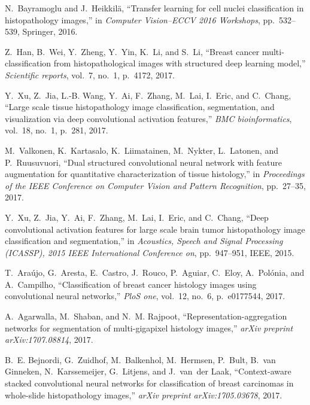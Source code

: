 \documentclass[runningheads,a4paper]{llncs}
\begin{document}
\begin{thebibliography}{10}
N.~Bayramoglu and J.~Heikkil{\"a}, ``Transfer learning for cell nuclei
  classification in histopathology images,'' in {\em Computer Vision--ECCV 2016
  Workshops}, pp.~532--539, Springer, 2016.

Z.~Han, B.~Wei, Y.~Zheng, Y.~Yin, K.~Li, and S.~Li, ``Breast cancer
  multi-classification from histopathological images with structured deep
  learning model,'' {\em Scientific reports}, vol.~7, no.~1, p.~4172, 2017.

Y.~Xu, Z.~Jia, L.-B. Wang, Y.~Ai, F.~Zhang, M.~Lai, I.~Eric, and C.~Chang,
  ``Large scale tissue histopathology image classification, segmentation, and
  visualization via deep convolutional activation features,'' {\em BMC
  bioinformatics}, vol.~18, no.~1, p.~281, 2017.

M.~Valkonen, K.~Kartasalo, K.~Liimatainen, M.~Nykter, L.~Latonen, and
  P.~Ruusuvuori, ``Dual structured convolutional neural network with feature
  augmentation for quantitative characterization of tissue histology,'' in {\em
  Proceedings of the IEEE Conference on Computer Vision and Pattern
  Recognition}, pp.~27--35, 2017.

Y.~Xu, Z.~Jia, Y.~Ai, F.~Zhang, M.~Lai, I.~Eric, and C.~Chang, ``Deep
  convolutional activation features for large scale brain tumor histopathology
  image classification and segmentation,'' in {\em Acoustics, Speech and Signal
  Processing (ICASSP), 2015 IEEE International Conference on}, pp.~947--951,
  IEEE, 2015.

T.~Ara{\'u}jo, G.~Aresta, E.~Castro, J.~Rouco, P.~Aguiar, C.~Eloy,
  A.~Pol{\'o}nia, and A.~Campilho, ``Classification of breast cancer histology
  images using convolutional neural networks,'' {\em PloS one}, vol.~12, no.~6,
  p.~e0177544, 2017.

A.~Agarwalla, M.~Shaban, and N.~M. Rajpoot, ``Representation-aggregation
  networks for segmentation of multi-gigapixel histology images,'' {\em arXiv
  preprint arXiv:1707.08814}, 2017.

B.~E. Bejnordi, G.~Zuidhof, M.~Balkenhol, M.~Hermsen, P.~Bult, B.~van Ginneken,
  N.~Karssemeijer, G.~Litjens, and J.~van~der Laak, ``Context-aware stacked
  convolutional neural networks for classification of breast carcinomas in
  whole-slide histopathology images,'' {\em arXiv preprint arXiv:1705.03678},
  2017.


\end{thebibliography}
\end{document}
